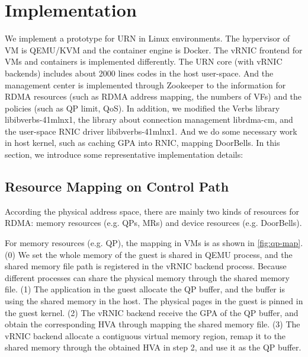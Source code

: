 \section{Implementation}
 We implement a prototype for URN in Linux environments. The hypervisor of VM is QEMU/KVM and the container engine is Docker. The vRNIC frontend for VMs and containers is implemented differently. The URN core (with vRNIC backends) includes about 2000 lines codes in the host user-space. And the management center is implemented through Zookeeper to the information for RDMA resources (such as RDMA address mapping, the numbers of VFs) and the policies (such as QP limit, QoS). In addition, we modified the Verbs library libibverbs-41mlnx1, the library about connection management librdma-cm, and the user-space RNIC driver libibverbs-41mlnx1. And we do some necessary work in host kernel, such as caching GPA into RNIC, mapping DoorBells. In this section, we introduce some representative implementation details:
 
 \subsection{Resource Mapping on Control Path}
According the physical address space, there are mainly two kinds of resources for RDMA: memory resources (e.g. QPs, MRs) and device resources (e.g. DoorBells). 
 
 For memory resources (e.g. QP), the mapping in VMs is as shown in  \ref{fig:qp-map}. (0) We set the whole memory of the guest is shared in QEMU process, and the shared memory file path is registered in the vRNIC backend process. Because different processes can share the physical memory through the shared memory file. (1) The application in the guest allocate the QP buffer, and the buffer is using the shared memory in the host. The physical pages in the guest is pinned in the guest kernel. (2) The vRNIC backend receive the GPA of the QP buffer, and obtain the corresponding HVA through mapping the shared memory file. (3) The vRNIC backend allocate a contiguous virtual memory region, remap it to the shared memory through the obtained HVA in step 2, and use it as the QP buffer.
 
